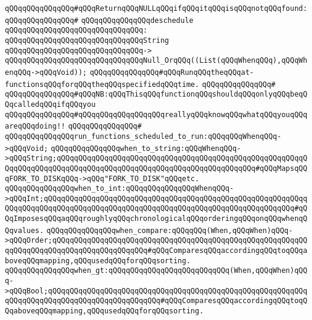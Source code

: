 \verb|qQQqqQQqqQQqqQQq#qQQqReturnqQQqNULLqQQqifqQQqitqQQqisqQQqnotqQQqfound:|\newline
\verb|qQQqqQQqqQQqqQQq#|\newline
\verb|qQQqqQQqqQQqqQQqdeschedule|\newline
\verb|qQQqqQQqqQQqqQQqqQQqqQQqqQQqqQQq:|\newline
\verb|qQQqqQQqqQQqqQQqqQQqqQQqqQQqqQQqString|\newline
\verb|qQQqqQQqqQQqqQQqqQQqqQQqqQQqqQQq->|\newline
\verb|qQQqqQQqqQQqqQQqqQQqqQQqqQQqqQQqNull_OrqQQq((List(qQQqWhenqQQq),qQQqWhenqQQq->qQQqVoid));|\newline
\newline
\verb|qQQqqQQqqQQqqQQq#qQQqRunqQQqtheqQQqat-functionsqQQqforqQQqtheqQQqspecifiedqQQqtime.|\newline
\verb|qQQqqQQqqQQqqQQq#|\newline
\verb|qQQqqQQqqQQqqQQq#qQQqNB:qQQqThisqQQqfunctionqQQqshouldqQQqonlyqQQqbeqQQqcalledqQQqifqQQqyou|\newline
\verb|qQQqqQQqqQQqqQQq#qQQqqQQqqQQqqQQqqQQqreallyqQQqknowqQQqwhatqQQqyouqQQqareqQQqdoing!!|\newline
\verb|qQQqqQQqqQQqqQQq#|\newline
\verb|qQQqqQQqqQQqqQQqrun_functions_scheduled_to_run:qQQqqQQqWhenqQQq->qQQqVoid;|\newline
\newline
\verb|qQQqqQQqqQQqqQQqwhen_to_string:qQQqWhenqQQq->qQQqString;qQQqqQQqqQQqqQQqqQQqqQQqqQQqqQQqqQQqqQQqqQQqqQQqqQQqqQQqqQQqqQQqqQQqqQQqqQQqqQQqqQQqqQQqqQQqqQQqqQQqqQQqqQQqqQQqqQQq#qQQqMapsqQQqFORK_TO_DISKqQQq->qQQq"FORK_TO_DISK"qQQqetc.|\newline
\verb|qQQqqQQqqQQqqQQqwhen_to_int:qQQqqQQqqQQqqQQqWhenqQQq->qQQqInt;qQQqqQQqqQQqqQQqqQQqqQQqqQQqqQQqqQQqqQQqqQQqqQQqqQQqqQQqqQQqqQQqqQQqqQQqqQQqqQQqqQQqqQQqqQQqqQQqqQQqqQQqqQQqqQQqqQQqqQQqqQQqqQQq#qQQqImposesqQQqaqQQqroughlyqQQqchronologicalqQQqorderingqQQqonqQQqwhenqQQqvalues.|\newline
\verb|qQQqqQQqqQQqqQQqwhen_compare:qQQqqQQq(When,qQQqWhen)qQQq->qQQqOrder;qQQqqQQqqQQqqQQqqQQqqQQqqQQqqQQqqQQqqQQqqQQqqQQqqQQqqQQqqQQqqQQqqQQqqQQqqQQqqQQqqQQqqQQqqQQq#qQQqComparesqQQqaccordingqQQqtoqQQqaboveqQQqmapping,qQQqusedqQQqforqQQqsorting.|\newline
\verb|qQQqqQQqqQQqqQQqwhen_gt:qQQqqQQqqQQqqQQqqQQqqQQqqQQq(When,qQQqWhen)qQQq->qQQqBool;qQQqqQQqqQQqqQQqqQQqqQQqqQQqqQQqqQQqqQQqqQQqqQQqqQQqqQQqqQQqqQQqqQQqqQQqqQQqqQQqqQQqqQQqqQQqqQQq#qQQqComparesqQQqaccordingqQQqtoqQQqaboveqQQqmapping,qQQqusedqQQqforqQQqsorting.|\newline
